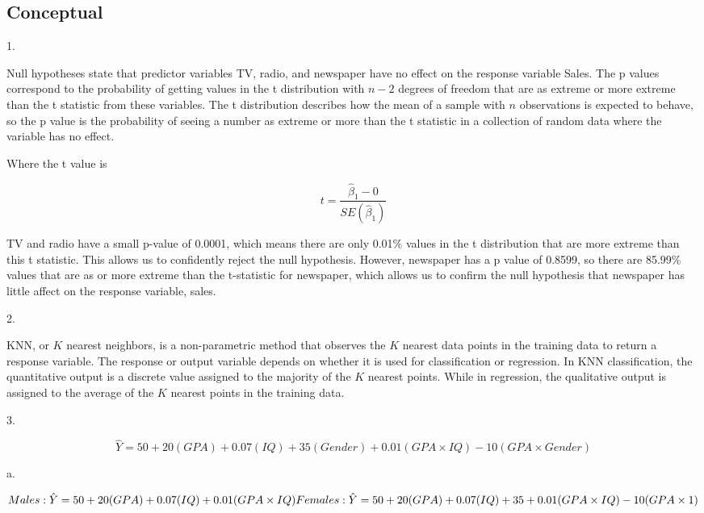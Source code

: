 \documentclass[
]{article}
\author{}
\date{}
\begin{document}
\hypertarget{header-n0}{%
\subsection{Conceptual}\label{header-n0}}

1.

Null hypotheses state that predictor variables TV, radio, and newspaper
have no effect on the response variable Sales. The p values correspond
to the probability of getting values in the t distribution with \(n-2\)
degrees of freedom that are as extreme or more extreme than the t
statistic from these variables. The t distribution describes how the
mean of a sample with \(n\) observations is expected to behave, so the p
value is the probability of seeing a number as extreme or more than the
t statistic in a collection of random data where the variable has no
effect.

Where the t value is

\[t = \frac{\hat\beta_1 - 0}{SE(\hat\beta_1)}\]

TV and radio have a small p-value of 0.0001, which means there are only
0.01\% values in the t distribution that are more extreme than this t
statistic. This allows us to confidently reject the null hypothesis.
However, newspaper has a p value of 0.8599, so there are 85.99\% values
that are as or more extreme than the t-statistic for newspaper, which
allows us to confirm the null hypothesis that newspaper has little
affect on the response variable, sales.

2.

KNN, or \(K\) nearest neighbors, is a non-parametric method that
observes the \(K\) nearest data points in the training data to return a
response variable. The response or output variable depends on whether it
is used for classification or regression. In KNN classification, the
quantitative output is a discrete value assigned to the majority of the
\(K\) nearest points. While in regression, the qualitative output is
assigned to the average of the \(K\) nearest points in the training
data.

3.

\[\hat{Y} = 50 + 20(GPA) + 0.07(IQ) + 35(Gender) + 0.01(GPA\times IQ) - 10(GPA\times Gender)\]

a.

\[Males : \hat{Y} = 50 + 20(GPA) + 0.07(IQ) + 0.01(GPA\times IQ)\\
Females : \hat{Y} = 50 + 20(GPA) + 0.07(IQ) + 35 + 0.01(GPA\times IQ) - 10(GPA\times 1)\]
\end{document}
